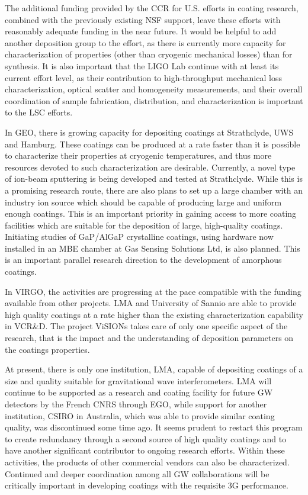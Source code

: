 \noindent The additional funding provided by the CCR for U.S. efforts in coating research, combined with the previously existing NSF support, leave these efforts with reasonably adequate funding in the near future. It would be helpful to add another deposition group to the effort, as there is currently more capacity for characterization of properties (other than cryogenic mechanical losses) than for synthesis. It is also important that the LIGO Lab continue with at least its current effort level, as their contribution to high-throughput mechanical loss characterization, optical scatter and homogeneity measurements, and their overall coordination of sample fabrication, distribution, and characterization is important to the LSC efforts.

In GEO, there is growing capacity for depositing coatings at Strathclyde, UWS and Hamburg. These coatings can be produced at a rate faster than it is possible to characterize their properties at cryogenic temperatures, and thus more resources devoted to such characterization are desirable. Currently, a novel type of ion-beam sputtering is being developed and tested at Strathclyde. While this is a promising research route, there are also plans to set up a large chamber with an industry ion source which should be capable of producing large and uniform enough coatings. This is an important priority in gaining access to more coating facilities which are suitable for the deposition of large, high-quality coatings. Initiating studies of GaP/AlGaP crystalline coatings, using hardware now installed in an MBE chamber at Gas Sensing Solutions Ltd, is also planned. This is an important parallel research direction to the development of amorphous coatings.

In VIRGO, the activities are progressing at the pace compatible with the funding available from other projects.  LMA and University of Sannio are able to provide high quality coatings at a rate higher than the existing characterization capability in VCR\&D. The project ViSIONs takes care of only one specific aspect of the research, that is the impact and the understanding of deposition parameters on the coatings properties.

At present, there is only one institution, LMA, capable of depositing coatings of a size and quality suitable for gravitational wave interferometers. LMA will continue to be supported as a research and coating facility for future GW detectors by the French CNRS through EGO, while support for another institution, CSIRO in Australia, which was able to provide similar coating quality, was discontinued some time ago. It seems prudent to restart this program to create redundancy through a second source of high quality coatings and to have another significant contributor to ongoing research efforts. Within these activities, the products of other commercial vendors can also be characterized. 
Continued and deeper coordination among all GW collaborations will be critically important in developing coatings with the requisite 3G performance.

